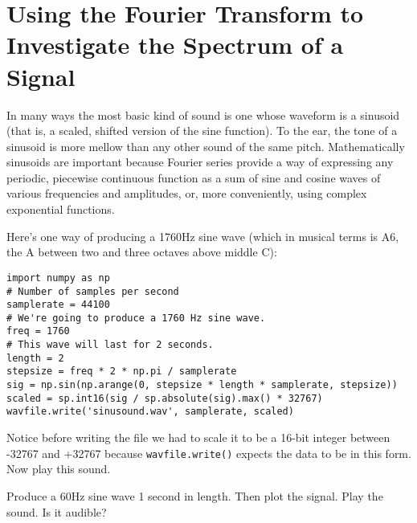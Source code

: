 \section*{Using the Fourier Transform to Investigate the Spectrum of a Signal}

In many ways the most basic kind of sound is one whose waveform is a sinusoid (that is, a scaled, shifted version of the sine function).
To the ear, the tone of a sinusoid is more mellow than any other sound of the same pitch.
Mathematically sinusoids are important because Fourier series provide a way of expressing any periodic, piecewise continuous function as a sum of sine and cosine waves of various frequencies and amplitudes, or, more conveniently, using complex exponential functions.

Here's one way of producing a 1760Hz sine wave (which in musical terms is A6, the A between two and three octaves above middle C):
%
\begin{lstlisting}
import numpy as np
# Number of samples per second
samplerate = 44100 
# We're going to produce a 1760 Hz sine wave.
freq = 1760 
# This wave will last for 2 seconds.
length = 2 
stepsize = freq * 2 * np.pi / samplerate
sig = np.sin(np.arange(0, stepsize * length * samplerate, stepsize))
scaled = sp.int16(sig / sp.absolute(sig).max() * 32767)
wavfile.write('sinusound.wav', samplerate, scaled)
\end{lstlisting}

Notice before writing the file we had to scale it to be a 16-bit integer between -32767 and +32767 because \texttt{wavfile.write()} expects the data to be in this form.
Now play this sound.

\begin{problem}
Produce a 60Hz sine wave 1 second in length.
Then plot the signal.
Play the sound.
Is it audible?
\end{problem}


